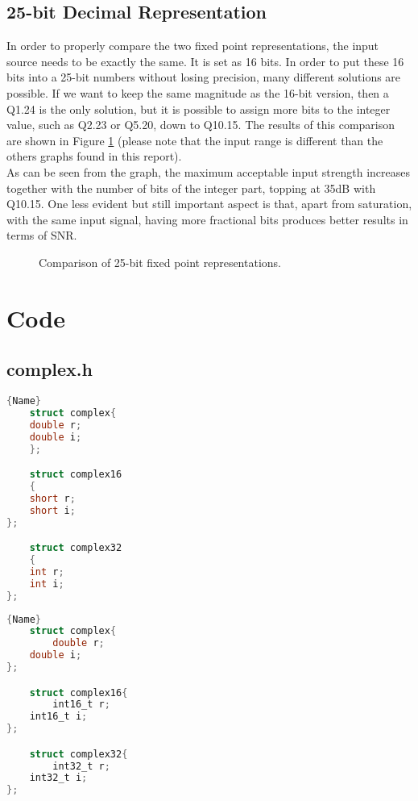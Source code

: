 \documentclass[a4paper]{article}
\begin{document}
\subsection{25-bit Decimal Representation}
In order to properly compare the two fixed point representations, the input source needs to be exactly the same. It is set as 16 bits. In order to put these 16 bits into a 25-bit numbers without losing precision, many different solutions are possible. If we want to keep the same magnitude as the 16-bit version, then a Q1.24 is the only solution, but it is possible to assign more bits to the integer value, such as Q2.23 or Q5.20, down to Q10.15. The results of this comparison are shown in Figure \ref{Fig:25bit} (please note that the input range is different than the others graphs found in this report).\\

As can be seen from the graph, the maximum acceptable input strength increases together with the number of bits of the integer part, topping at 35dB with Q10.15. One less evident but still important aspect is that, apart from saturation, with the same input signal, having more fractional bits produces better results in terms of SNR.

\begin{figure}
	\centering
	\resizebox{1.0\textwidth}{!}{}
	\caption{Comparison of 25-bit fixed point representations.}
	\label{Fig:25bit}
\end{figure}




\section{Code}
\subsection{complex.h}
\noindent\begin{minipage}{.45\textwidth}
    \begin{lstlisting}[caption=code 1 1,frame=tlrb, language=C]{Name}
    struct complex{
    double r;
    double i;
    };

    struct complex16
    {
    short r;
    short i;
};

    struct complex32
    {
    int r;
    int i;
};
    \end{lstlisting}
\end{minipage}\hfill
\begin{minipage}{.45\textwidth}
    \begin{lstlisting}[caption=code 2,frame=tlrb, language=C]{Name}
    struct complex{
        double r;
    double i;
};

    struct complex16{
        int16_t r;
    int16_t i;
};

    struct complex32{
        int32_t r;
    int32_t i;
};
    \end{lstlisting}
\end{minipage}
\end{document}

